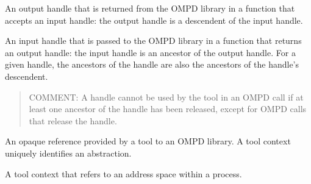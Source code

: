 \glossarydefstart
An output handle that is returned from the OMPD library in a function that 
accepts an input handle: the output handle is a descendent of the input handle.
\glossarydefend

\glossarydefstart
An input handle that is passed to the OMPD library in a function that 
returns an output handle: the input handle is an ancestor of the 
output handle. For a given handle, the ancestors of the handle are 
also the ancestors of the handle's descendent.

\begin{quote}
	COMMENT: A handle cannot be used by the tool in an OMPD call if at least 
	one ancestor of the handle has been released, except for OMPD calls 
	that release the handle.
\end{quote}
\glossarydefend

\glossarydefstart
An opaque reference provided by a tool to an OMPD library. A tool context uniquely identifies an abstraction.
\glossarydefend

\glossarydefstart
A tool context that refers to an address space within a process.
\glossarydefend

